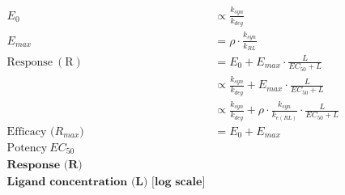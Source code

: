 \documentclass{standalone}
\begin{document}
\begin{math}
\begin{aligned}
	E_{0} &\propto \frac{k_{syn}}{k_{deg}} \\
	E_{max} &= \rho \cdot \frac{k_{syn}}{k_{RL}} \\
	\mathrm{Response\ (R)} &= E_{0} + E_{max} \cdot \frac{L}{EC_{50} + L} \\
		&\propto \frac{k_{syn}}{k_{deg}} + E_{max} \cdot \frac{L}{EC_{50} + L} \\
		&\propto \frac{k_{syn}}{k_{deg}} + \rho \cdot \frac{k_{syn}}{k_{e(RL)}} \cdot \frac{L}{EC_{50} + L} \\
	\text{Efficacy (} R_{max} \text{)} &= E_{0} + E_{max} \\
	\text{Potency}\ EC_{50} \\
	\textbf{Response (R)} \\
	\textbf{Ligand concentration (L) [log scale]}
\end{aligned}
\end{math}
\end{document}
